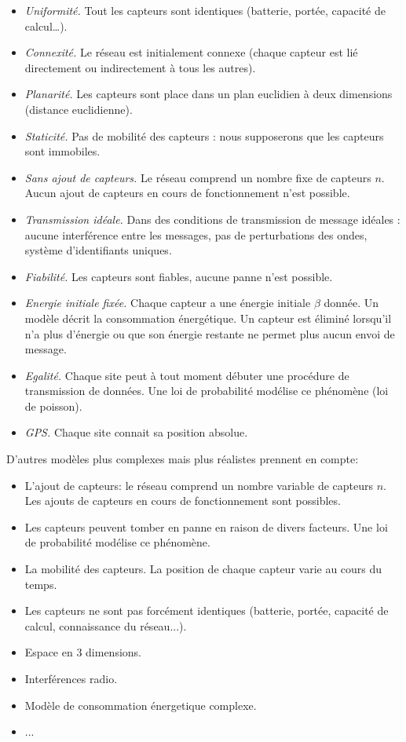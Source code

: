 \begin{itemize}
 \item \textit{Uniformité.} Tout les capteurs sont identiques (batterie, portée, capacité de calcul…).
 \item \textit{Connexité.} Le réseau est initialement connexe (chaque capteur est lié directement ou indirectement à tous les autres).
 \item \textit{Planarité.} Les capteurs sont place dans un plan euclidien à deux dimensions (distance euclidienne).
 \item \textit{Staticité.} Pas de mobilité des capteurs : nous supposerons que les capteurs sont immobiles.
 \item \textit{Sans ajout de capteurs.} Le réseau comprend un nombre fixe de capteurs $n$. Aucun ajout de capteurs en cours de fonctionnement n'est possible.
 \item \textit{Transmission idéale.} Dans des conditions de transmission de message idéales : aucune interférence entre les messages, pas de perturbations des ondes, système d'identifiants uniques.
 \item \textit{Fiabilité.} Les capteurs sont fiables, aucune panne n'est possible.
 \item \textit{Energie initiale fixée.} Chaque capteur a une énergie initiale $\beta$ donnée. Un modèle décrit la consommation énergétique. Un capteur est éliminé lorsqu'il n'a plus d'énergie ou que son énergie 
 restante ne permet plus aucun envoi de message. 
 \item \textit{Egalité.} Chaque site peut à tout moment débuter une procédure de transmission de données. Une loi de probabilité modélise ce phénomène (loi de poisson).
 \item \textit{GPS.} Chaque site connait sa position absolue.  \\
\end{itemize}

D'autres modèles plus complexes mais plus réalistes prennent en compte:
  
\begin{itemize}
   
 \item L'ajout de capteurs: le réseau comprend un nombre variable de capteurs $n$. Les ajouts de capteurs en cours de fonctionnement sont possibles.
 \item Les capteurs peuvent tomber en panne en raison de divers facteurs. Une loi de probabilité modélise ce phénomène.   
 \item La mobilité des capteurs. La position de chaque capteur varie au cours du temps.
 \item Les capteurs ne sont pas forcément identiques (batterie, portée, capacité de calcul, connaissance du réseau...).
 \item Espace en 3 dimensions.
 \item Interférences radio.
 \item Modèle de consommation énergetique complexe.
 \item ...
\end{itemize}


